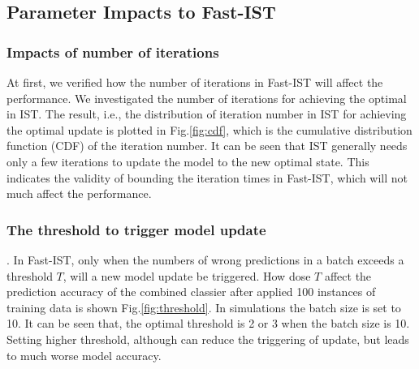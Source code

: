 \documentclass[letterpaper]{article}
\begin{document}




\subsection{Parameter Impacts to Fast-IST}

\subsubsection{Impacts of number of iterations}
At first, we verified how the number of iterations in Fast-IST will affect the performance. We investigated the number of iterations for achieving the optimal in IST.
The result, i.e., the distribution of iteration number in IST for achieving the optimal update is plotted in Fig.\ref{fig:cdf}, which is the cumulative distribution function (CDF) of the iteration number.
It can be seen that IST generally needs only a few iterations to update the model to the new optimal state. This indicates the validity of bounding the iteration times in Fast-IST, which will not much affect the performance.


\subsubsection{The threshold to trigger model update}. In Fast-IST, only when the numbers of wrong predictions in a batch exceeds a threshold $T$, will a new model update be triggered. How dose  $T$ affect the prediction accuracy of the combined classier after applied 100 instances of training data is shown Fig.\ref{fig:threshold}. In simulations the batch size is set to 10. It can be seen that, the optimal threshold is 2 or 3 when the batch size is 10. Setting higher threshold, although can reduce the triggering of update, but leads to much worse model accuracy.
\end{document}
